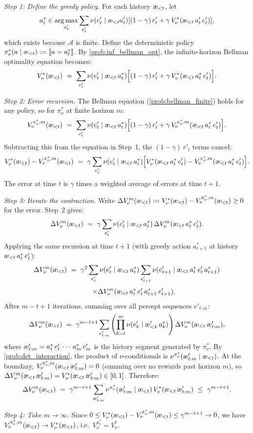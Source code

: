\documentclass[fontsize=11pt, parskip=half]{scrartcl}
\theoremstyle{definition}
\newenvironment{solution}{%
    \begin{tcolorbox}[colback=black!5!white, colframe=black!50!white,
      title={\textbf{Solution}}, fonttitle=\normalfont, breakable]
  }{\end{tcolorbox}}
\newenvironment{solution}{\expandafter\comment}{\expandafter\endcomment}
\newcommand{\cA}{\mathcal{A}}
\DeclareMathOperator*{\argmax}{arg\,max}
\newcommand{\aes}{\textnormal{\ae}}
\begin{document}
\begin{solution}
\emph{Step 1: Define the greedy policy.}
For each history $\aes_{<t}$, let
$$
a^*_t \in \argmax_{a'_t} \sum_{e'_t} \nu(e'_t \mid \aes_{<t} a'_t) [(1-\gamma)\, r'_t + \gamma\, V_\nu^*(\aes_{<t}\, a'_t\, e'_t)],
$$
which exists because $\cA$ is finite.
Define the deterministic policy $\pi_\nu^*(a \mid \aes_{<t}) := \llbracket a = a^*_t \rrbracket$.
By \cref{prob:inf_bellman_opt}, the infinite-horizon Bellman optimality equation becomes:
\[
    V_\nu^*(\aes_{<t}) ~=~ \sum_{e'_t} \nu(e'_t \mid \aes_{<t}\, a^*_t) \Big[(1-\gamma)\, r'_t + \gamma\, V_\nu^*(\aes_{<t}\, a^*_t\, e'_t)\Big].
\]

\emph{Step 2: Error recursion.}
The Bellman equation (\cref{prob:bellman_finite}) holds for any policy, so for $\pi_\nu^*$ at finite horizon $m$:
\[
    V_\nu^{\pi_\nu^*,m}(\aes_{<t}) ~=~ \sum_{e'_t} \nu(e'_t \mid \aes_{<t}\, a^*_t) \Big[(1-\gamma)\, r'_t + \gamma\, V_\nu^{\pi_\nu^*,m}(\aes_{<t}\, a^*_t\, e'_t)\Big].
\]
Subtracting this from the equation in Step~1, the $(1-\gamma)\, r'_t$ terms cancel:
\[
    V_\nu^*(\aes_{<t}) - V_\nu^{\pi_\nu^*,m}(\aes_{<t})
    ~=~ \gamma \sum_{e'_t} \nu(e'_t \mid \aes_{<t}\, a^*_t) \Big[V_\nu^*(\aes_{<t}\, a^*_t\, e'_t) - V_\nu^{\pi_\nu^*,m}(\aes_{<t}\, a^*_t\, e'_t)\Big].
\]
The error at time $t$ is $\gamma$ times a weighted average of errors at time $t+1$.

\emph{Step 3: Iterate the contraction.}
Write $\Delta V_\nu^m(\aes_{<t}) := V_\nu^*(\aes_{<t}) - V_\nu^{\pi_\nu^*,m}(\aes_{<t}) \geq 0$ for the error. Step~2 gives:
\[
    \Delta V_\nu^m(\aes_{<t}) ~=~ \gamma \sum_{e'_t} \nu(e'_t \mid \aes_{<t}\, a^*_t)\, \Delta V_\nu^m(\aes_{<t}\, a^*_t\, e'_t).
\]
Applying the same recursion at time $t+1$ (with greedy action $a^*_{t+1}$ at history $\aes_{<t}\, a^*_t\, e'_t$):
\[
    \Delta V_\nu^m(\aes_{<t}) ~=~ \gamma^2 \sum_{e'_t} \nu(e'_t \mid \aes_{<t}\, a^*_t)
    \sum_{e'_{t+1}} \nu(e'_{t+1} \mid \aes_{<t}\, a^*_t\, e'_t\, a^*_{t+1})
\]
\[
    \qquad
    \times \Delta V_\nu^m(\aes_{<t}\, a^*_t\, e'_t\, a^*_{t+1}\, e'_{t+1}).
\]
After $m - t + 1$ iterations, summing over all percept sequences $e'_{t:m}$:
\[
    \Delta V_\nu^m(\aes_{<t}) ~=~ \gamma^{m-t+1} \sum_{e'_{t:m}} \left(\prod_{k=t}^m \nu(e'_k \mid \aes'_{<k}\, a^*_k)\right) \Delta V_\nu^m(\aes_{<t}\, \aes'_{t:m}),
\]
where $\aes'_{t:m} = a^*_t\, e'_t\, \cdots\, a^*_m\, e'_m$ is the history segment generated by $\pi_\nu^*$.
By \cref{prob:det_interaction}, the product of $\nu$-conditionals is $\nu^{\pi_\nu^*}(\aes'_{t:m} \mid \aes_{<t})$.
At the boundary, $V_\nu^{\pi_\nu^*,m}(\aes_{<t}\, \aes'_{t:m}) = 0$ (summing over no rewards past horizon $m$), so $\Delta V_\nu^m(\aes_{<t}\, \aes'_{t:m}) = V_\nu^*(\aes_{<t}\, \aes'_{t:m}) \in [0,1]$.
Therefore:
\[
    \Delta V_\nu^m(\aes_{<t})
    ~=~ \gamma^{m-t+1} \sum_{\aes'_{t:m}} \nu^{\pi_\nu^*}(\aes'_{t:m} \mid \aes_{<t})\, V_\nu^*(\aes_{<t}\, \aes'_{t:m})
    ~\leq~ \gamma^{m-t+1}.
\]

\emph{Step 4: Take $m \to \infty$.}
Since $0 \leq V_\nu^*(\aes_{<t}) - V_\nu^{\pi_\nu^*,m}(\aes_{<t}) \leq \gamma^{m-t+1} \to 0$,
we have $V_\nu^{\pi_\nu^*,m}(\aes_{<t}) \to V_\nu^*(\aes_{<t})$, i.e.\ $V_\nu^{\pi_\nu^*} = V_\nu^*$.
\end{solution}
\end{document}
